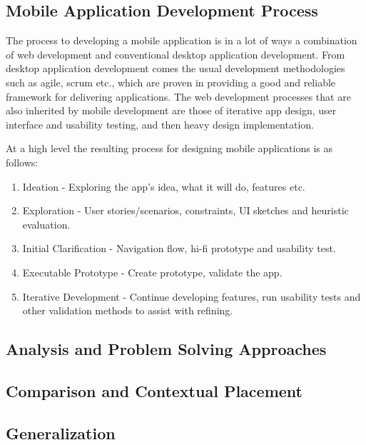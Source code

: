 \documentclass[11pt,english,numbers=endperiod,parskip=half]{scrartcl}
\begin{document}
  \subsection{Mobile Application Development Process}
    The process to developing a mobile application is in a lot of ways a
    combination of web development and conventional desktop application development.
    From desktop application development comes the usual development methodologies
    such as agile, scrum etc., which are proven in providing a good and reliable
    framework for delivering applications. The web development processes that
    are also inherited by mobile development are those of iterative app design,
    user interface and usability testing, and then heavy design implementation.

    At a high level the resulting process for designing mobile applications is
    as follows:
    \begin{enumerate}
      \item{
        Ideation - Exploring the app's idea, what it will do, features etc.
      }
      \item{
        Exploration - User stories/scenarios, constraints, UI sketches and
        heuristic evaluation.
      }
      \item{
        Initial Clarification - Navigation flow, hi-fi prototype and usability
        test.
      }
      \item{
        Executable Prototype - Create prototype, validate the app.
      }
      \item{
        Iterative Development - Continue developing features, run usability
        tests and other validation methods to assist with refining.
      }
    \end{enumerate}
  \subsection{Analysis and Problem Solving Approaches}

  \subsection{Comparison and Contextual Placement}

  \subsection{Generalization}
\end{document}

